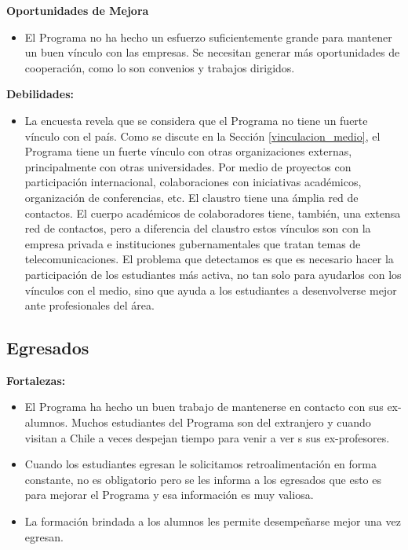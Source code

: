 \noindent\textbf{Oportunidades de Mejora}

\begin{itemize}
\item El Programa no ha hecho un esfuerzo suficientemente grande para mantener un buen vínculo con las empresas. Se necesitan 
generar más oportunidades de cooperación, como lo son convenios y trabajos dirigidos.                                                     
\end{itemize}

\noindent\textbf{Debilidades:}
\begin{itemize}
\item La encuesta revela que se considera que el Programa no tiene un fuerte vínculo con el país. Como se discute en la 
Sección \ref{vinculacion_medio}, el Programa tiene un fuerte vínculo con otras organizaciones externas, principalmente 
con otras universidades. Por medio de proyectos con participación internacional, colaboraciones con iniciativas académicos, 
organización de conferencias, etc. El claustro tiene una ámplia red de contactos. El cuerpo académicos de colaboradores 
tiene, también, una extensa red de contactos, pero a diferencia del claustro estos vínculos son con la empresa privada e 
instituciones gubernamentales que tratan temas de telecomunicaciones. El problema que detectamos es que es necesario hacer 
la participación de los estudiantes más activa, no tan solo para ayudarlos con los vínculos con el medio, sino que ayuda 
a los estudiantes a desenvolverse mejor ante profesionales del área.
\end{itemize}

\subsection{Egresados}

\noindent\textbf{Fortalezas:}

\begin{itemize}
\item El Programa ha hecho un buen trabajo de mantenerse en contacto con sus ex-alumnos. Muchos estudiantes del Programa son del extranjero 
y cuando visitan a Chile a veces despejan tiempo para venir a ver s sus ex-profesores.
\item Cuando los estudiantes egresan le solicitamos retroalimentación en forma constante, no es obligatorio pero se les informa a 
los egresados que esto es para mejorar el Programa y esa información es muy valiosa.
\item La formación brindada a los alumnos les permite desempeñarse mejor una vez egresan. 
\end{itemize}

